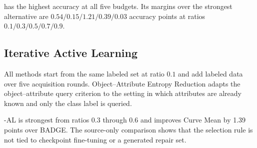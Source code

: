 \model has the highest accuracy at all five budgets. Its margins over the strongest alternative are $0.54/0.15/1.21/0.39/0.03$ accuracy points at ratios $0.1/0.3/0.5/0.7/0.9$.

\subsection{Iterative Active Learning}

All methods start from the same labeled set at ratio $0.1$ and add labeled data over five acquisition rounds. Object--Attribute Entropy Reduction adapts the object--attribute query criterion to the setting in which attributes are already known and only the class label is queried.

\begin{table}[t]
\centering
\caption{ImageNet10 source-only iterative active learning. Metric: five-seed mean test accuracy (\%); Curve Mean averages ratios $0.1$--$0.6$.}
\label{tab:source-only-active-learning}
\small
\setlength{\tabcolsep}{3pt}
\end{table}

\modelplain-AL is strongest from ratios $0.3$ through $0.6$ and improves Curve Mean by 1.39 points over BADGE. The source-only comparison shows that the selection rule is not tied to checkpoint fine-tuning or a generated repair set.

